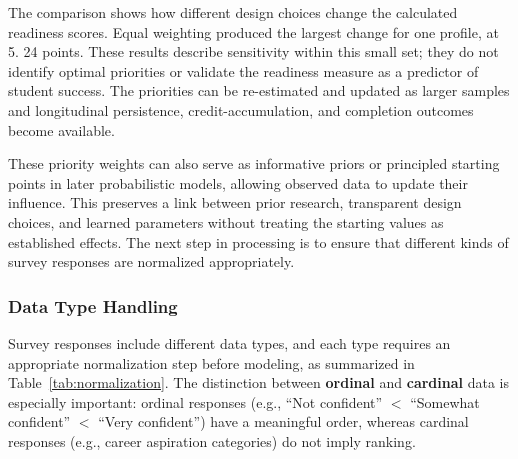 \documentclass[letterpaper,11pt]{article}
\newcommand{\DIFadd}[1]{%
  \begingroup\setlength{\fboxsep}{0.5pt}%
  \colorbox{diffaddbg}{\textcolor{diffaddtext}{#1}}%
  \endgroup}
\begin{document}
\DIFadd{The} \DIFadd{comparison} \DIFadd{shows} \DIFadd{how} \DIFadd{different} \DIFadd{design} \DIFadd{choices} \DIFadd{change} \DIFadd{the} \DIFadd{calculated} \DIFadd{readiness} \DIFadd{scores.} \DIFadd{Equal} \DIFadd{weighting} \DIFadd{produced} \DIFadd{the} \DIFadd{largest} \DIFadd{change} \DIFadd{for} \DIFadd{one} \DIFadd{profile,} \DIFadd{at} \DIFadd{5.}\DIFadd{24} \DIFadd{points.} \DIFadd{These} \DIFadd{results} \DIFadd{describe} \DIFadd{sensitivity} \DIFadd{within} \DIFadd{this} \DIFadd{small} \DIFadd{set;} \DIFadd{they} \DIFadd{do} \DIFadd{not} \DIFadd{identify} \DIFadd{optimal} \DIFadd{priorities} \DIFadd{or} \DIFadd{validate} \DIFadd{the} \DIFadd{readiness} \DIFadd{measure} \DIFadd{as} \DIFadd{a} \DIFadd{predictor} \DIFadd{of} \DIFadd{student} \DIFadd{success.} \DIFadd{The} \DIFadd{priorities} \DIFadd{can} \DIFadd{be} \DIFadd{re-estimated} \DIFadd{and} \DIFadd{updated} \DIFadd{as} \DIFadd{larger} \DIFadd{samples} \DIFadd{and} \DIFadd{longitudinal} \DIFadd{persistence,} \DIFadd{credit-accumulation,} \DIFadd{and} \DIFadd{completion} \DIFadd{outcomes} \DIFadd{become} \DIFadd{available.}

\DIFadd{These} \DIFadd{priority} \DIFadd{weights} \DIFadd{can} \DIFadd{also} \DIFadd{serve} \DIFadd{as} \DIFadd{informative} \DIFadd{priors} \DIFadd{or} \DIFadd{principled} \DIFadd{starting} \DIFadd{points} \DIFadd{in} \DIFadd{later} \DIFadd{probabilistic} \DIFadd{models,} \DIFadd{allowing} \DIFadd{observed} \DIFadd{data} \DIFadd{to} \DIFadd{update} \DIFadd{their} \DIFadd{influence.} \DIFadd{This} \DIFadd{preserves} \DIFadd{a} \DIFadd{link} \DIFadd{between} \DIFadd{prior} \DIFadd{research,} \DIFadd{transparent} \DIFadd{design} \DIFadd{choices,} \DIFadd{and} \DIFadd{learned} \DIFadd{parameters} \DIFadd{without} \DIFadd{treating} \DIFadd{the} \DIFadd{starting} \DIFadd{values} \DIFadd{as} \DIFadd{established} \DIFadd{effects.} \DIFadd{The} \DIFadd{next} \DIFadd{step} \DIFadd{in} \DIFadd{processing} \DIFadd{is} \DIFadd{to} \DIFadd{ensure} \DIFadd{that} \DIFadd{different} \DIFadd{kinds} \DIFadd{of} \DIFadd{survey} \DIFadd{responses} \DIFadd{are} \DIFadd{normalized} \DIFadd{appropriately.}

\subsubsection{Data Type Handling}

Survey responses include different data types, and each type requires an appropriate normalization step before modeling, as summarized in Table~\ref{tab:normalization}. The distinction between \textbf{ordinal} and \textbf{cardinal} data is especially important: ordinal responses (e.g., ``Not confident'' $<$ ``Somewhat confident'' $<$ ``Very confident'') have a meaningful order, whereas cardinal responses (e.g., career aspiration categories) do not imply ranking.
\end{document}
